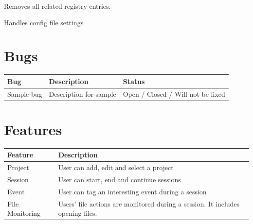 \documentclass[letterpaper,10pt,english]{sphinxmanual}
\begin{document}
\begin{fulllineitems}
\begin{fulllineitems}
\end{fulllineitems}


\begin{fulllineitems}
\label{api:wos.WORKER_THREAD.RemoveAllRegEntries}
Removes all related registry entries.

\end{fulllineitems}


\begin{fulllineitems}
\label{api:wos.WORKER_THREAD.parseConfig}
Handles config file settings

\end{fulllineitems}


\end{fulllineitems}



\chapter{Bugs}
\label{bugs::doc}\label{bugs:bugs}
\begin{tabulary}{\linewidth}{|L|L|L|}
\hline
\textbf{\relax 
Bug
} & \textbf{\relax 
Description
} & \textbf{\relax 
Status
}\\\hline

Sample bug
 & 
Description for sample
 & 
Open / Closed / Will not be fixed
\\\hline
\end{tabulary}



\chapter{Features}
\label{features::doc}\label{features:features}
\begin{tabulary}{\linewidth}{|L|L|}
\hline
\textbf{\relax 
Feature
} & \textbf{\relax 
Description
}\\\hline

Project
 & 
User can add, edit and select a project
\\\hline

Session
 & 
User can start, end and continue sessions
\\\hline

Event
 & 
User can tag an interesting event during  a session
\\\hline

File Monitoring
 & 
Users' file actions are monitored during a session. It includes opening files.
\\\hline
\end{tabulary}
\end{document}

